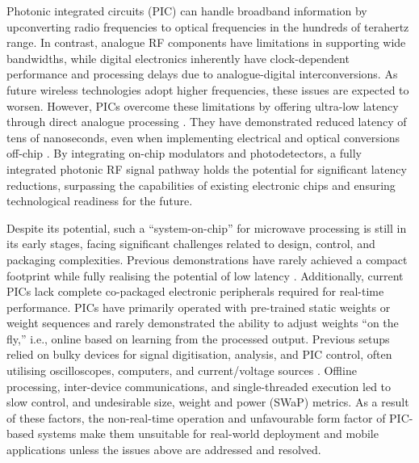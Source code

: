\documentclass[pdflatex,mathphys]{sty}%
\begin{document}
Photonic integrated circuits (PIC) can handle broadband information by upconverting radio frequencies to optical frequencies in the hundreds of terahertz range. In contrast, analogue RF components have limitations in supporting wide bandwidths, while digital electronics inherently have clock-dependent performance and processing delays due to analogue-digital interconversions. As future wireless technologies adopt higher frequencies, these issues are expected to worsen. However, PICs overcome these limitations by offering ultra-low latency through direct analogue processing \cite{yang2022multi,daulay2022ultrahigh,huang2021silicon,shastri2021photonics,hu2020reconfigurable,marpaung2019integrated,perez2017multipurpose,wang2015reconfigurable,ghelfi2014fully}. They have demonstrated reduced latency of tens of nanoseconds, even when implementing electrical and optical conversions off-chip \cite{zhang2022broadband,lederman2023real}. By integrating on-chip modulators and photodetectors, a fully integrated photonic RF signal pathway holds the potential for significant latency reductions, surpassing the capabilities of existing electronic chips and ensuring technological readiness for the future.

Despite its potential, such a ``system-on-chip'' for microwave processing is still in its early stages, facing significant challenges related to design, control, and packaging complexities. Previous demonstrations have rarely achieved a compact footprint while fully realising the potential of low latency \cite{bogaerts2020programmable,perez2020multipurpose}. Additionally, current PICs lack complete co-packaged electronic peripherals required for real-time performance. PICs have primarily operated with pre-trained static weights or weight sequences and rarely demonstrated the ability to adjust weights ``on the fly,'' i.e., online based on learning from the processed output. Previous setups relied on bulky devices for signal digitisation, analysis, and PIC control, often utilising oscilloscopes, computers, and current/voltage sources \cite{zhang2022broadband,ghelfi2014fully}. Offline processing, inter-device communications, and single-threaded execution led to slow control, and undesirable size, weight and power (SWaP) metrics. As a result of these factors, the non-real-time operation and unfavourable form factor of PIC-based systems make them unsuitable for real-world deployment and mobile applications unless the issues above are addressed and resolved.
\end{document}
